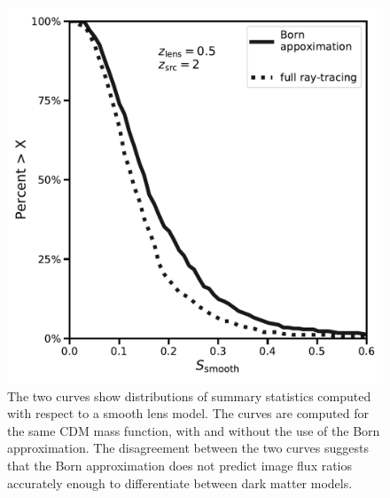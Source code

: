 \begin{figure}
	\centering
	\includegraphics[clip,trim=0cm 0.5cm 0cm
	0cm,width=.6\textwidth,keepaspectratio]{./figures_LOSforward/test_born.pdf}
	\caption[On the effect of the Born approximation in multi-plane lensing]{\label{fig:bornfluxes} The two curves show distributions of summary statistics computed with respect to a smooth lens model. The curves are computed for the same CDM mass function, with and without the use of the Born approximation. The disagreement between the two curves suggests that the Born approximation does not predict image flux ratios accurately enough to differentiate between dark matter models.}
\end{figure}	

